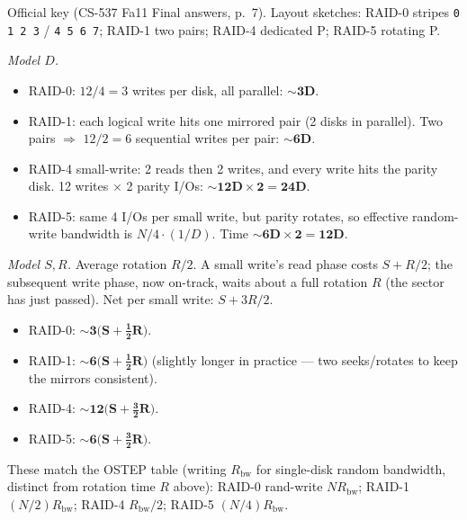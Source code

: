\documentclass[11pt,a4paper]{article}
\newenvironment{Sol}{%
  \begin{tcolorbox}[sboxstyle, title={Solution}]%
}{%
  \end{tcolorbox}\vspace{0.35em}%
}
\begin{document}
\begin{Sol}
Official key (CS-537 Fa11 Final answers, p.~7). Layout sketches:
RAID-0 stripes \texttt{0 1 2 3} / \texttt{4 5 6 7}; RAID-1 two pairs;
RAID-4 dedicated P; RAID-5 rotating P.

\textit{Model $D$.}
\begin{itemize}
\item RAID-0: $12/4 = 3$ writes per disk, all parallel:
      $\boldsymbol{\sim 3D}$.
\item RAID-1: each logical write hits one mirrored pair (2 disks in
      parallel). Two pairs $\Rightarrow$ $12/2 = 6$ sequential writes
      per pair: $\boldsymbol{\sim 6D}$.
\item RAID-4 small-write: 2 reads then 2 writes, and every write hits
      the parity disk. 12 writes $\times$ 2 parity I/Os:
      $\boldsymbol{\sim 12D \times 2 = 24D}$.
\item RAID-5: same 4 I/Os per small write, but parity rotates, so
      effective random-write bandwidth is $N/4 \cdot (1/D)$.
      Time $\boldsymbol{\sim 6D \times 2 = 12D}$.
\end{itemize}

\textit{Model $S,R$.} Average rotation $R/2$. A small write's read
phase costs $S+R/2$; the subsequent write phase, now on-track, waits
about a full rotation $R$ (the sector has just passed). Net per small
write: $S + 3R/2$.
\begin{itemize}
\item RAID-0: $\boldsymbol{\sim 3\bigl(S + \tfrac12 R\bigr)}$.
\item RAID-1: $\boldsymbol{\sim 6\bigl(S + \tfrac12 R\bigr)}$
      (slightly longer in practice --- two seeks/rotates to keep the
      mirrors consistent).
\item RAID-4: $\boldsymbol{\sim 12\bigl(S + \tfrac32 R\bigr)}$.
\item RAID-5: $\boldsymbol{\sim 6\bigl(S + \tfrac32 R\bigr)}$.
\end{itemize}
These match the OSTEP table (writing $R_{\mathrm{bw}}$ for single-disk random bandwidth, distinct from rotation time $R$ above): RAID-0 rand-write $NR_{\mathrm{bw}}$; RAID-1 $(N/2)R_{\mathrm{bw}}$; RAID-4 $R_{\mathrm{bw}}/2$; RAID-5 $(N/4)R_{\mathrm{bw}}$.
\end{Sol}
\end{document}
